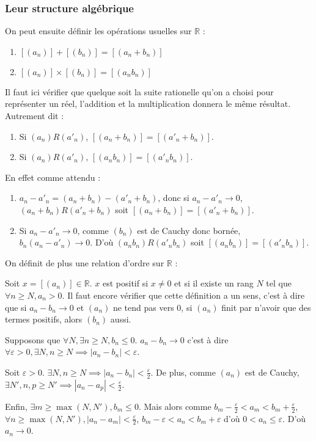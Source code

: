\subsubsection{Leur structure algébrique}
On peut ensuite définir les opérations usuelles sur $\mathbb{R}$ :
\begin{defini}
    \begin{enumerate}
        \item $[(a_n)]+[(b_n)]=[(a_n+b_n)]$
        \item $[(a_{n})]\times [(b_{n})]=[(a_{n}b_{n})]$
    \end{enumerate}
 
    \tcblower
    Il faut ici vérifier que quelque soit la suite rationelle qu'on a choisi pour représenter un réel, l'addition et la multiplication donnera le même résultat. Autrement dit :
    \begin{enumerate}
        \item Si $(a_n)R(a'_n)$, $[(a_n+b_n)]=[(a'_n+b_n)]$.
        \item Si $(a_n)R(a'_n)$, $[(a_nb_n)]=[(a'_nb_n)]$.
    \end{enumerate}

    En effet comme attendu :
    \begin{enumerate}
    \item $a_n-a'_n = (a_{n}+b_{n})- (a'_{n}+b_{n})$, donc si $a_n-a'_n \to 0$, $(a_n+b_n)R(a'_n+b_n)$ soit $[(a_n+b_n)]=[(a'_n+b_n)]$.
    \item Si $a_n-a'_n \to 0$, comme $(b_n)$ est de Cauchy donc bornée, $b_n(a_n-a'_n) \to 0$.  D'où $(a_nb_n)R(a'_nb_n)$ soit $[(a_nb_n)]=[(a'_nb_n)]$.
    \end{enumerate}
\end{defini}

On définit de plus une relation d'ordre sur $\mathbb{R}$ :
\begin{defini}
Soit $x = [(a_n)] \in \mathbb{R}$. $x$ est positif si $x\neq 0$ et si il existe un rang $N$ tel que $\forall n \geq N, a_n > 0$. 
\tcblower
Il faut encore vérifier que cette définition a un sens, c'est à dire que si $a_n-b_n \to 0$ et $(a_n)$ ne tend pas vers 0, si $(a_n)$ finit par n'avoir que des termes positifs, alors $(b_n)$ aussi. 

Supposons que $\forall N, \exists n \geq N, b_n \leq 0$. $a_n-b_n \to 0$ c'est à dire $\forall \varepsilon >0, \exists N, n \geq N \implies  |a_n-b_n|<\varepsilon$.

Soit $\varepsilon >0$. $\exists N, n \geq N \implies  |a_n-b_n|<\frac{\varepsilon}{2}$. De plus, comme $(a_n)$ est de Cauchy, $\exists N', n, p \geq N' \implies |a_{n}-a_{p}| < \frac{\varepsilon}{2}$.

Enfin, $\exists m \geq \max(N, N'), b_m \leq 0$.  Mais alors comme $b_{m}- \frac{\varepsilon}{2}<a_m<b_{m}+ \frac{\varepsilon}{2}$, $\forall n \geq \max(N, N'), |a_n-a_m|< \frac{\varepsilon}{2}$, $b_m-\varepsilon<a_n<b_m+\varepsilon$ d'où $0<a_n\leq \varepsilon$. D'où $a_n \to 0$. 
\end{defini}

